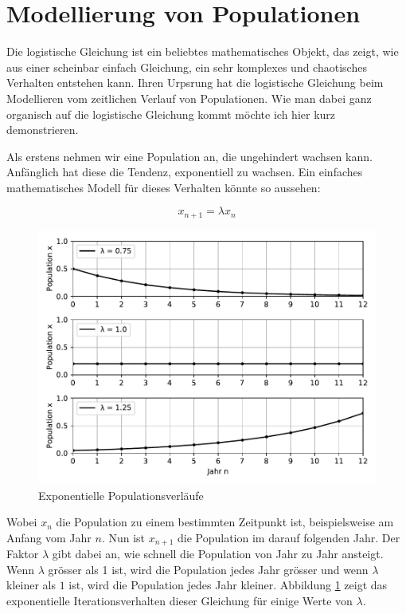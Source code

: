 %
%
%
\section{Modellierung von Populationen\label{logistic:section:einleitung}}

Die logistische Gleichung ist ein beliebtes mathematisches Objekt,
das zeigt, wie aus einer scheinbar einfach Gleichung,
ein sehr komplexes und chaotisches Verhalten entstehen kann. 
Ihren Urpsrung hat die logistische Gleichung beim Modellieren
vom zeitlichen Verlauf von Populationen. 
Wie man dabei ganz organisch auf die logistische Gleichung 
kommt möchte ich hier kurz demonstrieren.

\medskip

Als erstens nehmen wir eine Population an, 
die ungehindert wachsen kann. 
Anfänglich hat diese die Tendenz, exponentiell zu wachsen. 
Ein einfaches mathematisches Modell für dieses Verhalten
könnte so aussehen:

\begin{equation}
    x_{n+1} = \lambda x_{n}
\end{equation}

\begin{figure}
    \includegraphics[width=\linewidth]{papers/logistic/figures/pop_exp.pdf}
    \caption{Exponentielle Populationsverläufe}
    \label{fig:pop_exp}
\end{figure}

Wobei $x_{n}$ die Population zu einem bestimmten Zeitpunkt ist, 
beispielsweise am Anfang vom Jahr $n$. 
Nun ist $x_{n+1}$ die Population im darauf folgenden Jahr. 
Der Faktor $\lambda$ gibt dabei an, wie schnell die Population
von Jahr zu Jahr ansteigt. 
Wenn $\lambda$ grösser als 1 ist,
wird die Population jedes Jahr grösser 
und wenn $\lambda$ kleiner als $1$ ist, 
wird die Population jedes Jahr kleiner.
Abbildung \ref{fig:pop_exp} zeigt das exponentielle 
Iterationsverhalten dieser Gleichung 
für einige Werte von $\lambda$. 


